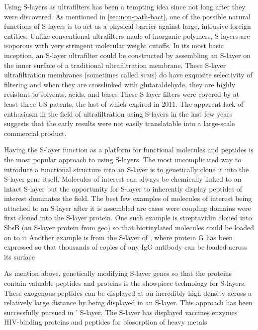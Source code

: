   Using \acp{S-layer} as ultrafilters has been a tempting idea since not long after they were discovered. As mentioned in \cref{sec:non-path-bact}, one of the possible natural
functions of \acp{S-layer} is to act as a physical barrier against large, intrusive foreign entities. Unlike conventional ultrafilters made of inorganic polymers, \acp{S-layer} are
isoporous with very stringent molecular weight cutoffs. In its most basic inception, an \ac{S-layer} ultrafilter could be constructed by assembling an \ac{S-layer} on the inner
surface of a traditional ultrafiltration membrane. These \ac{S-layer} ultrafiltration membranes (sometimes called \textsc{sum}s) do have exquisite selectivity of filtering and when
they are crosslinked with glutaraldehyde, they are highly resistant to solvents, acids, and bases These \ac{S-layer} filters were covered by at least
three US patents, the last of which expired in 2011. The apparent lack of enthusiasm in the field of ultrafiltration using \acp{S-layer} in the last few years suggests that the
early results were not easily translatable into a large-scale commercial product.
  
 Having the \ac{S-layer} function as a platform for functional molecules and peptides is the most popular approach to using \acp{S-layer}. The most uncomplicated way to introduce
a functional structure into an \ac{S-layer} is to genetically clone it into the \ac{S-layer} gene itself. Molecules of interest can always be chemically linked to an intact
\ac{S-layer} but the opportunity for \ac{S-layer} to inherently display peptides of interest dominates the field. The best few examples of molecules
of interest being attached to an \ac{S-layer} after it is assembled are cases were coupling domains were first cloned into the \ac{S-layer} protein. One such example is
streptavidin cloned into SbsB (an \ac{S-layer} protein from \ac{geo}) so that biotinylated molecules could be loaded on to it Another example is from the
\ac{S-layer} of \caulobacter{}, where protein G has been expressed so that thousands of copies of any IgG antibody can be loaded across its surface

  As mention above, genetically modifying \ac{S-layer} genes so that the proteins contain valuable peptides and proteins is the showpiece technology for \acp{S-layer}. These
exogenous peptides can be displayed at an incredibly high density across a relatively large distance by being displayed in an \ac{S-layer}. This approach has been successfully
pursued in \caulobacter{}' \ac{S-layer}. The \caulobacter{} \ac{S-layer} has displayed vaccines enzymes HIV-binding
proteins and peptides for biosorption of heavy metals


